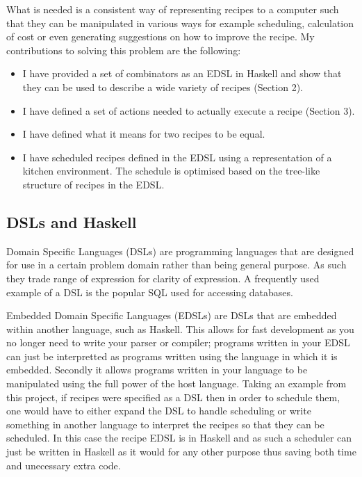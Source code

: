 \documentclass[11pt]{article}
\begin{document}
\medbreak

What is needed is a consistent way of representing recipes to
a computer such that they can be manipulated in various ways
for example scheduling, calculation of cost or even generating
suggestions on how to improve the recipe. My contributions
to solving this problem are the following:

\begin{itemize}
    \item I have provided a set of combinators as an EDSL in Haskell and show that
    they can be used to describe a wide variety of recipes (Section 2).

    \item I have defined a set of actions needed to actually execute a recipe (Section 3).

    \item I have defined what it means for two recipes to be equal.

    \item I have scheduled recipes defined in the EDSL using a representation
    of a kitchen environment. The schedule is optimised based on the tree-like
    structure of recipes in the EDSL.
\end{itemize}

\subsection{DSLs and Haskell}
Domain Specific Languages (DSLs) are programming languages that
are designed for use in a certain problem domain rather than
being general purpose. As such they trade range of expression
for clarity of expression. A frequently used example of a DSL
is the popular SQL used for accessing databases.

\medbreak

Embedded Domain Specific Languages (EDSLs) are DSLs that are embedded
within another language, such as Haskell. This allows for
fast development as you no longer need to write your parser
or compiler; programs written in your EDSL can just be interpretted
as programs written using the language in which it is embedded.
Secondly it allows programs written in your language to be
manipulated using the full power of the host language. Taking
an example from this project, if recipes were specified as a DSL
then in order to schedule them, one would have to either expand
the DSL to handle scheduling or write something in another language
to interpret the recipes so that they can be scheduled. In this
case the recipe EDSL is in Haskell and as such a scheduler can
just be written in Haskell as it would for any other purpose thus
saving both time and unecessary extra code.
\end{document}
